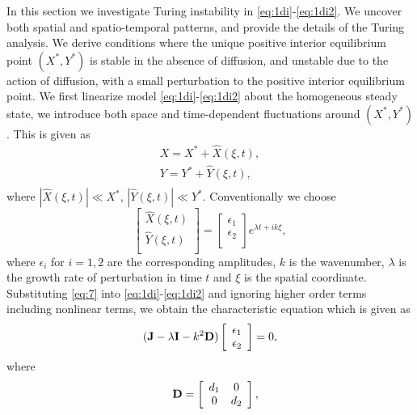 \documentclass[10pt]{amsart}
\theoremstyle{definition}
\begin{document}
In this section we investigate Turing instability in \eqref{eq:1di}-\eqref{eq:1di2}. We uncover both spatial and spatio-temporal patterns, and provide the details of the Turing analysis. 
We derive conditions where the unique positive interior equilibrium point $(X^*,Y^*)$ is stable in the absence of diffusion, and unstable due to the action of diffusion, with a small perturbation to the positive interior equilibrium point. We first linearize model \eqref{eq:1di}-\eqref{eq:1di2} about the homogeneous steady state, we introduce both space and time-dependent fluctuations around $(X^*,Y^*)$. This is given as
\begin{subequations}\label{eq:7}
\begin{align}
X=X^* +  \hat{X}(\xi,t),\\
Y=Y^* + \hat{Y}(\xi,t),\\
\end{align}
\end{subequations}
where $| \hat{X}(\xi,t)|\ll X^*$, $| \hat{Y}(\xi,t)|\ll Y^*$. Conventionally we choose
\[
\left[ {\begin{array}{cc}
\hat{X}(\xi,t)  \\
\hat{Y}(\xi,t) \\
\end{array} } \right]
=
\left[ {\begin{array}{cc}
\epsilon_1  \\
\epsilon_2 \\
\end{array} } \right]
e^{\lambda t + ik\xi},
\]
where  $\epsilon_i$ for $i=1,2$ are the corresponding amplitudes, $k$ is the wavenumber, $\lambda$ is the growth rate of perturbation in time $t$ and $\xi$ is the spatial coordinate.
Substituting \eqref{eq:7} into \eqref{eq:1di}-\eqref{eq:1di2} and ignoring higher order terms including nonlinear terms, we obtain the characteristic equation  which  is given as
\begin{align}\label{eq:1.2.10}
({\bf J} - \lambda{\bf I} - k^2{\bf D})
\left[ {\begin{array}{cc}
\epsilon_1  \\
\epsilon_2 \\
\end{array} } \right]=0,
\end{align}
where
\[
\quad
\bf {D} =
\left[ {\begin{array}{cc}
d_1 & 0      \\
0     & d_2  \\
\end{array} } \right],
\]
\end{document}
